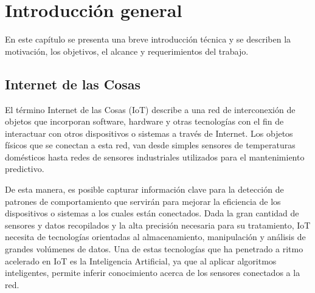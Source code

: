 
\chapter{Introducción general} %

\label{Chapter1} %
\label{IntroGeneral}


\newcommand{\keyword}[1]{\textbf{#1}}
\newcommand{\tabhead}[1]{\textbf{#1}}
\newcommand{\code}[1]{\texttt{#1}}
\newcommand{\file}[1]{\texttt{\bfseries#1}}
\newcommand{\option}[1]{\texttt{\itshape#1}}
\newcommand{\grados}{$^{\circ}$}


En este capítulo se presenta una breve introducción técnica y se describen la motivación, los objetivos, el alcance y requerimientos del trabajo.
\section{Internet de las Cosas}
El término Internet de las Cosas (IoT) describe a una red de interconexión de objetos que incorporan software, hardware y otras tecnologías con el fin de interactuar con otros dispositivos o sistemas a través de Internet. Los objetos físicos que se conectan a esta red, van desde simples sensores de temperaturas domésticos hasta redes de sensores industriales utilizados para el mantenimiento predictivo.

De esta manera, es posible capturar información clave para la detección de patrones de comportamiento que servirán para mejorar la eficiencia de los dispositivos o sistemas a los cuales están conectados. Dada la gran cantidad de sensores y datos recopilados y la alta precisión necesaria para su tratamiento, IoT necesita de tecnologías orientadas al almacenamiento, manipulación y análisis de grandes volúmenes de datos. Una de estas tecnologías que ha penetrado a ritmo acelerado en IoT es la Inteligencia Artificial, ya que al aplicar algoritmos inteligentes, permite inferir conocimiento acerca de los sensores conectados a la red.

